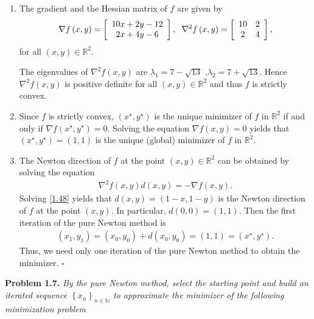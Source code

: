 \documentclass[a4paper]{article}
\numberwithin{equation}{section}
\begin{document}
\begin{enumerate}
\item The gradient and the Hessian matrix of $f$ are given by
\begin{align}
\nabla f\left( {x,y} \right) = \left[ {\begin{array}{*{20}{c}}
{10x + 2y - 12}\\
{2x + 4y - 6}
\end{array}} \right],\hspace{0.2cm}  {\nabla ^2}f\left( {x,y} \right) = \left[ {\begin{array}{*{20}{c}}
{10}&2\\
2&4
\end{array}} \right],
\end{align}
for all $\left(x,y\right)\in \mathbb{R}^2$.

The eigenvalues of ${\nabla ^2}f\left( {x,y} \right)$ are ${\lambda _1} = 7 - \sqrt {13}$ ,${\lambda _2} = 7 + \sqrt {13}$. Hence ${\nabla ^2}f\left( {x,y} \right)$ is positive definite for all $\left(x,y\right)\in \mathbb{R}^2$ and thus $f$ is strictly convex.
\item Since $f$ is strictly convex, $\left(x^\star,y^\star\right)$ is the unique minimizer of $f$ in $\mathbb{R}^2$ if and only if $\nabla f\left( {{x^\star},{y^\star}} \right) = 0$. Solving the equation $\nabla f\left( {x,y} \right) = 0$ yields that $\left(x^\star,y^\star\right) =\left(1,1\right)$ is the unique (global) minimizer of $f$ in $\mathbb{R}^2$.
\item The Newton direction of $f$ at the point $\left(x,y\right)\in \mathbb{R}^2$ can be obtained by solving the equation
\begin{align}
\label{1.48}
{\nabla ^2}f\left( {x,y} \right)d\left( {x,y} \right) =  - \nabla f\left( {x,y} \right) .
\end{align}
Solving \eqref{1.48} yields that $d\left( {x,y} \right) = \left( {1 - x,1 - y} \right)$ is the Newton direction of $f$ at the point $\left(x,y\right)$. In particular, $d\left(0,0\right)=\left(1,1\right)$. Then the first iteration of the pure Newton method is 
\begin{align}
\left( {{x_1},{y_1}} \right) = \left( {{x_0},{y_0}} \right) + d\left( {{x_0},{y_0}} \right) = \left( {1,1} \right) = \left(x^\star,y^\star\right) .
\end{align}
Thus, we need only one iteration of the pure Newton method to obtain the minimizer. \hfill $\square$
\end{enumerate}
\textbf{Problem 1.7.} \textit{By the pure Newton method, select the starting point and  build an iterated sequence ${\left\{ {{x_n}} \right\}_{n \in \mathbb{N}}}$ to approximate the minimizer of the following minimization problem}
\end{document}
